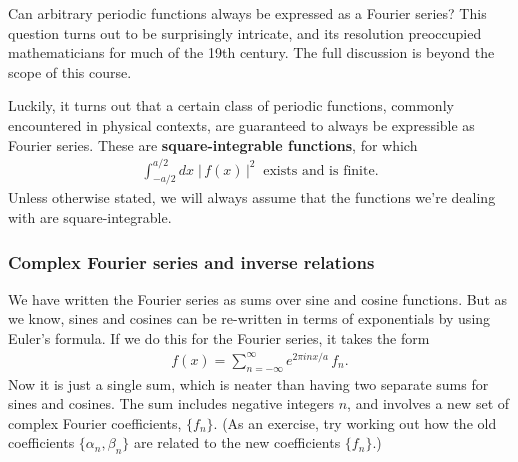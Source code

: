 \documentclass[10pt,a4paper]{article}
\begin{document}
Can arbitrary periodic functions always be expressed as a Fourier
series? This question turns out to be surprisingly intricate, and its
resolution preoccupied mathematicians for much of the 19th
century. The full discussion is beyond the scope of this course.

Luckily, it turns out that a certain class of periodic functions,
commonly encountered in physical contexts, are guaranteed to always be
expressible as Fourier series. These are \textbf{square-integrable
  functions}, for which
\begin{align}
  \int_{-a/2}^{a/2} dx\; \big|\,f(x)\,\big|^2\;\;\text{exists and is finite}.
\end{align}
Unless otherwise stated, we will always assume that the functions
we're dealing with are square-integrable.

\subsubsection{Complex Fourier series and inverse relations}
\label{complex-fourier-series-and-inverse-relations}

We have written the Fourier series as sums over sine and cosine
functions. But as we know, sines and cosines can be re-written in
terms of exponentials by using Euler's formula. If we do this for the
Fourier series, it takes the form
\begin{align}
  f(x) = \sum_{n=-\infty}^\infty e^{2\pi i n x/a}\, f_n.
\end{align}
Now it is just a single sum, which is neater than having two separate
sums for sines and cosines. The sum includes negative integers $n$,
and involves a new set of complex Fourier coefficients, $\{f_n\}$. (As
an exercise, try working out how the old coefficients $\{\alpha_n,
\beta_n\}$ are related to the new coefficients $\{f_n\}$.)
\end{document}
